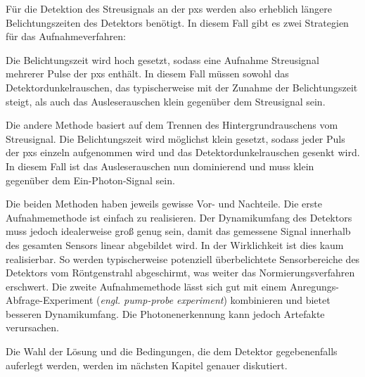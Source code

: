 \noindent
Für die Detektion des Streusignals an der \gls{pxs} werden also erheblich längere Belichtungszeiten des Detektors benötigt. In diesem Fall gibt es zwei Strategien für das Aufnahmeverfahren:

\noindent
Die Belichtungszeit wird hoch gesetzt, sodass eine Aufnahme Streusignal mehrerer Pulse der \gls{pxs} enthält. In diesem Fall müssen sowohl das Detektordunkelrauschen, das typischerweise mit der Zunahme der Belichtungszeit steigt, als auch das Ausleserauschen klein gegenüber dem Streusignal sein.

\noindent
Die andere Methode basiert auf dem Trennen des Hintergrundrauschens vom Streusignal. Die Belichtungszeit wird möglichst klein gesetzt, sodass jeder Puls der \gls{pxs} einzeln aufgenommen wird und das Detektordunkelrauschen gesenkt wird. In diesem Fall ist das Ausleserauschen nun dominierend und muss klein gegenüber dem Ein-Photon-Signal sein.

\noindent
Die beiden Methoden haben jeweils gewisse Vor- und Nachteile. Die erste Aufnahmemethode ist einfach zu realisieren. Der Dynamikumfang des Detektors muss jedoch idealerweise groß genug sein, damit das gemessene Signal innerhalb des gesamten Sensors linear abgebildet wird. In der Wirklichkeit ist dies kaum realisierbar. So werden typischerweise potenziell überbelichtete Sensorbereiche des Detektors vom Röntgenstrahl abgeschirmt, was weiter das Normierungsverfahren erschwert. Die zweite Aufnahmemethode lässt sich gut mit einem Anregungs-Abfrage-Experiment (\emph{engl. pump-probe experiment}) kombinieren und bietet besseren Dynamikumfang. Die Photonenerkennung kann jedoch Artefakte verursachen.

\noindent
Die Wahl der Lösung und die Bedingungen, die dem Detektor gegebenenfalls auferlegt werden, werden im nächsten Kapitel genauer diskutiert.


